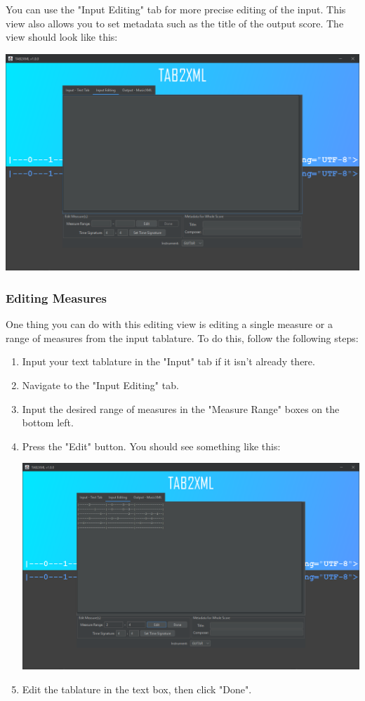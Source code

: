 \documentclass[11pt]{article}
\begin{document}
You can use the "Input Editing" tab for more precise editing of the input.  This view also allows you to set metadata such as the title of the output score.  The view should look like this:
\begin{center}
\includegraphics[width=.9\linewidth]{../Screenshots/input-editing-tabbedview-1.0.0.png}
\end{center}
\subsubsection{Editing Measures}
\label{sec:orgf4bb2cd}
One thing you can do with this editing view is editing a single measure or a range of measures from the input tablature.  To do this, follow the following steps:
\begin{enumerate}
\item Input your text tablature in the "Input" tab if it isn't already there.
\item Navigate to the "Input Editing" tab.
\item Input the desired range of measures in the "Measure Range" boxes on the bottom left.
\item Press the "Edit" button.  You should see something like this:
\begin{center}
\includegraphics[width=.9\linewidth]{../Screenshots/sample-input-editing-tabbedview.png}
\end{center}
\item Edit the tablature in the text box, then click "Done".
\end{enumerate}
\end{document}
